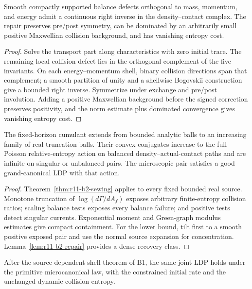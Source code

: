 \begin{lemma}
\label{lem:r11-b2-repair}
Smooth compactly supported balance defects orthogonal to mass, momentum, and
energy admit a continuous right inverse in the density--contact complex.  The
repair preserves pre/post symmetry, can be dominated by an arbitrarily small
positive Maxwellian collision background, and has vanishing entropy cost.
\end{lemma}

\begin{proof}
Solve the transport part along characteristics with zero initial trace.  The
remaining local collision defect lies in the orthogonal complement of the
five invariants.  On each energy--momentum shell, binary collision directions
span that complement; a smooth partition of unity and a shellwise Bogovskii
construction give a bounded right inverse.  Symmetrize under exchange and
pre/post involution.  Adding a positive Maxwellian background before the
signed correction preserves positivity, and the norm estimate plus dominated
convergence gives vanishing entropy cost.
\end{proof}

\begin{theorem}
\label{thm:r11-b2-gc}
The fixed-horizon cumulant extends from bounded analytic balls to an increasing
family of real truncation balls.  Their convex conjugates increase to the full
Poisson relative-entropy action on balanced density--actual-contact paths and
are infinite on singular or unbalanced pairs.  The microscopic pair satisfies
a good grand-canonical LDP with that action.
\end{theorem}

\begin{proof}
Theorem~\ref{thm:r11-b2-sewing} applies to every fixed bounded real source.
Monotone truncation of $\log(d\Gamma/dA_f)$ exposes arbitrary finite-entropy
collision ratios; scaling balance tests exposes every balance failure; and
positive tests detect singular currents.  Exponential moment and Green-graph
modulus estimates give compact containment.  For the lower bound, tilt first
to a smooth positive exposed pair and use the normal source expansion for
concentration.  Lemma~\ref{lem:r11-b2-repair} provides a dense recovery class.
\end{proof}

\begin{theorem}
\label{thm:r11-b2-mc}
After the source-dependent shell theorem of B1, the same joint LDP holds under
the primitive microcanonical law, with the constrained initial rate and the
unchanged dynamic collision entropy.
\end{theorem}

